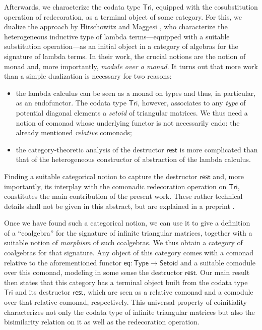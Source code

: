 \documentclass{easychair}
\newcommand{\constfont}[1]{\ensuremath{\mathsf{#1}}}
\newcommand{\Tri}{\constfont{Tri}}
\newcommand{\tail}{\constfont{rest}}
\newcommand{\eq}{\constfont{eq}}
\newcommand{\Type}{\constfont{Type}}
\newcommand{\Setoid}{\constfont{Setoid}}
\begin{document}
 Afterwards, we characterize the codata type $\Tri$, equipped with the cosubstitution operation of redecoration, as a terminal object of some category.
 For this, we dualize the approach by Hirschowitz and Maggesi \cite{DBLP:journals/iandc/HirschowitzM10},
 who characterize the heterogeneous inductive type of lambda terms---equipped with a suitable substitution operation---as an initial object in
 a category of algebras for the signature of lambda terms.
 In their work, the crucial notions are the notion of monad and, more importantly, \emph{module over a monad}.
 It turns out that more work than a simple dualization is necessary for two reasons:
 \begin{itemize}
  \item the lambda calculus can be seen as a monad on types and thus, in particular, as an endofunctor.
        The codata type $\Tri$, however, associates to any \emph{type} of potential diagonal elements a \emph{setoid}
        of triangular matrices. We thus need a notion of comonad whose underlying functor is not necessarily endo: the 
        already mentioned \emph{relative} comonads;
  \item the category-theoretic analysis of the destructor $\tail$ is more complicated than that of the heterogeneous 
           constructor of abstraction of the lambda calculus.
 \end{itemize}
 Finding a suitable categorical notion to capture the destructor $\tail$ and, more importantly, its interplay with
 the comonadic redecoration operation on $\Tri$, constitutes the main contribution of the present work.
 These rather technical details shall not be given in this abstract, but are explained in a preprint \cite{trimat_coq}.
 
 



  Once we have found such a categorical notion, we can use 
  it to give a definition of a \enquote{coalgebra} for the signature of infinite triangular matrices, 
  together with a suitable notion of \emph{morphism} of such coalgebras.
   We thus obtain a category of coalgebras for that signature.
  Any object of this category comes with a comonad relative to the aforementioned functor $\eq : \Type\to\Setoid$
  and a suitable comodule over this comonad, modeling in some sense the destructor $\tail$.
  Our main result then states that this category 
  has a terminal object built from the codata type $\Tri$ and its destructor $\tail$,
  which are seen as a relative comonad and a comodule over that relative comonad, respectively.
  This universal property of coinitiality characterizes not only the codata type of infinite triangular matrices but also
  the bisimilarity relation on it as well as the redecoration operation.
 
\end{document}
